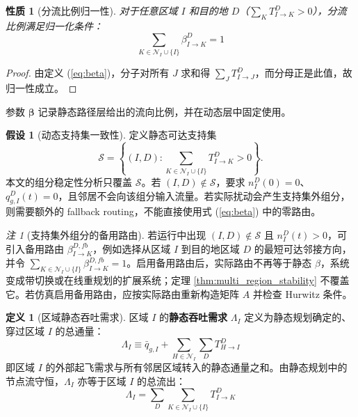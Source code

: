 \documentclass[a4paper,12pt]{article}
\theoremstyle{plain}
\newtheorem{property}[theorem]{性质}
\theoremstyle{definition}
\newtheorem{definition}[theorem]{定义}
\newtheorem{assumption}[theorem]{假设}
\theoremstyle{remark}
\newtheorem{remark}[theorem]{注}
\begin{document}
\begin{property}[分流比例归一性]\label{prop:beta_normalization}
对于任意区域 $I$ 和目的地 $D$（$\sum_K T_{I \to K}^D > 0$），分流比例满足归一化条件：
\begin{equation}
    \sum_{K \in \mathcal{N}_I \cup \{I\}} \beta_{I \to K}^D = 1
\end{equation}
\end{property}

\begin{proof}
由定义 (\ref{eq:beta})，分子对所有 $J$ 求和得 $\sum_J T_{I \to J}^D$，而分母正是此值，故归一性成立。
\end{proof}

参数 $\bm{\beta}$ 记录静态路径层给出的流向比例，并在动态层中固定使用。

\begin{assumption}[动态支持集一致性]\label{asm:support_consistency}
定义静态可达支持集
\begin{equation}\label{eq:support_set}
    \mathcal S=\left\{(I,D):\sum_{K\in\mathcal N_I\cup\{I\}}T_{I\to K}^D>0\right\}.
\end{equation}
本文的组分稳定性分析只覆盖 $\mathcal S$。若 $(I,D)\notin\mathcal S$，要求 $n_I^D(0)=0$、$q_{g,I}^D(t)=0$，且邻居不会向该组分输入流量。若实际扰动会产生支持集外组分，则需要额外的 fallback routing，不能直接使用式 (\ref{eq:beta}) 中的零路由。
\end{assumption}

\begin{remark}[支持集外组分的备用路由]\label{rem:fallback_routing}
若运行中出现 $(I,D)\notin\mathcal S$ 且 $n_I^D(t)>0$，可引入备用路由 $\beta_{I\to K}^{D,fb}$，例如选择从区域 $I$ 到目的地区域 $D$ 的最短可达邻接方向，并令 $\sum_{K\in\mathcal N_I\cup\{I\}}\beta_{I\to K}^{D,fb}=1$。启用备用路由后，实际路由不再等于静态 $\beta$，系统变成带切换或在线重规划的扩展系统；定理 \ref{thm:multi_region_stability} 不覆盖它。若仿真启用备用路由，应按实际路由重新构造矩阵 $A$ 并检查 Hurwitz 条件。
\end{remark}

\begin{definition}[区域静态吞吐需求]\label{def:lambda}
区域 $I$ 的\textbf{静态吞吐需求} $\Lambda_I$ 定义为静态规划确定的、穿过区域 $I$ 的总通量：
\begin{equation}\label{eq:lambda_def}
    \Lambda_I \equiv \bar{q}_{g,I} + \sum_{H \in \mathcal{N}_I} \sum_D T_{H \to I}^D
\end{equation}
即区域 $I$ 的外部起飞需求与所有邻居区域转入的静态通量之和。由静态规划中的节点流守恒，$\Lambda_I$ 亦等于区域 $I$ 的总流出：
\begin{equation}\label{eq:lambda_outflow}
    \Lambda_I = \sum_D \sum_{K \in \mathcal{N}_I \cup \{I\}} T_{I \to K}^D
\end{equation}
\end{definition}
\end{document}
